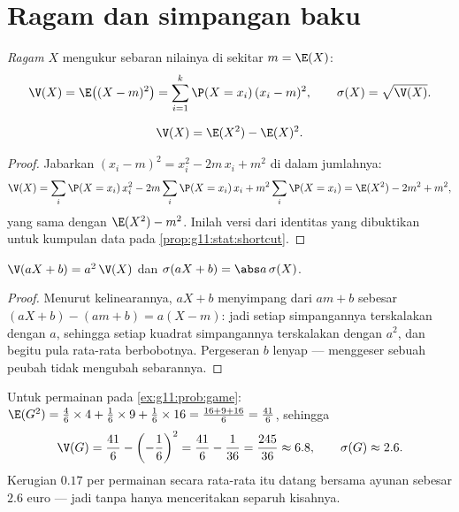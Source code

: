 \section{Ragam dan simpangan baku}

\begin{definition}[Ragam]\label{def:g11:prob:variance}
\emph{Ragam} $X$ mengukur sebaran nilainya
di sekitar  $m = \E(X)$:
\[
\V(X) = \E\bigl((X - m)^2\bigr)
= \sum_{i=1}^{k} \P(X = x_i)\,(x_i - m)^2,
\qquad
\sigma(X) = \sqrt{\V(X)} .
\]
\end{definition}

\begin{proposition}\label{prop:g11:prob:konig}
\[
\V(X) = \E(X^2) - \E(X)^2 .
\]
\end{proposition}

\begin{proof}
Jabarkan $(x_i - m)^2 = x_i^2 - 2m\,x_i + m^2$ di dalam jumlahnya:
\[
\V(X) = \sum_i \P(X = x_i)\,x_i^2
- 2m \sum_i \P(X = x_i)\,x_i + m^2\sum_i \P(X = x_i)
= \E(X^2) - 2m^2 + m^2 ,
\]
yang sama dengan $\E(X^2) - m^2$. Inilah versi  dari
identitas yang dibuktikan untuk kumpulan data pada \cref{prop:g11:stat:shortcut}.
\end{proof}

\begin{proposition}\label{prop:g11:prob:affine}
$\V(aX + b) = a^2\,\V(X)$ dan $\sigma(aX + b) = \abs a\,\sigma(X)$.
\end{proposition}

\begin{proof}
Menurut kelinearannya, $aX + b$ menyimpang dari  $a m + b$
sebesar $(aX + b) - (am + b) = a(X - m)$: jadi setiap simpangannya terskalakan
dengan $a$, sehingga setiap kuadrat simpangannya terskalakan dengan $a^2$, dan
begitu pula rata-rata berbobotnya. Pergeseran $b$ lenyap --- menggeser sebuah
peubah tidak mengubah sebarannya.
\end{proof}

\begin{example}\label{ex:g11:prob:variance}
Untuk permainan pada \cref{ex:g11:prob:game}:
$\E(G^2) = \frac46 \times 4 + \frac16 \times 9 + \frac16 \times 16
= \frac{16 + 9 + 16}{6} = \frac{41}{6}$, sehingga
\[
\V(G) = \frac{41}{6} - \left(-\frac16\right)^2
= \frac{41}{6} - \frac{1}{36} = \frac{245}{36} \approx 6.8,
\qquad
\sigma(G) \approx 2.6 .
\]
Kerugian $0.17$ per permainan secara rata-rata itu datang bersama ayunan
sebesar $2.6$ euro --- jadi  tanpa  hanya
menceritakan separuh kisahnya.
\end{example}

